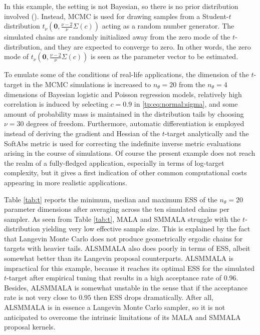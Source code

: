 \documentclass[twoside,11pt]{article}
\begin{document}
In this example, the setting is not Bayesian, so there is no prior distribution involved (\cite{pap_mir_gir__mon}). Instead, 
MCMC is used for drawing samples from a Student-$t$ distribution $t_{\nu}(\mathbf{0},\frac{\nu-2}{\nu}\Sigma(c))$ acting as 
a random number generator. The simulated chains are randomly initialized away from the zero mode of the $t$-distribution, 
and they are expected to converge to zero. In other words, the zero mode of $t_{\nu}(\mathbf{0},\frac{\nu-2}{\nu}\Sigma(c))$ 
is seen as the parameter vector to be estimated.

To emulate some of the conditions of real-life applications, the dimension of the $t$-target in the MCMC simulations is 
increased to $n_{\theta}=20$ from the $n_{\theta}=4$ dimensions of Bayesian logistic and Poisson regression models, 
relatively high correlation is induced by selecting $c=0.9$ in \eqref{tp:eq:normal:sigma}, and some amount of probability 
mass is maintained in the distribution tails by choosing $\nu=30$ degrees of freedom. Furthermore, automatic differentiation 
is employed instead of deriving the gradient and Hessian of the $t$-target analytically and the SoftAbs metric is used for 
correcting the indefinite inverse metric evaluations arising in the course of simulations. Of course the present example does
not reach the realm of a fully-fledged application, especially in terms of log-target complexity, but it gives a first
indication of other common computational costs appearing in more realistic applications.

Table \ref{tab:t} reports the minimum, median and maximum ESS of the $n_{\theta}=20$ parameter dimensions after averaging 
across the ten simulated chains per sampler. As seen from Table \ref{tab:t}, MALA and SMMALA struggle with the 
$t$-distribution yielding very low effective sample size. This is explained by the fact that Langevin Monte Carlo does not 
produce geometrically ergodic chains for targets with heavier tails. ALSMMALA also does poorly in terms of ESS, albeit 
somewhat better than its Langevin proposal counterparts. ALSMMALA is impractical for this example, because it reaches its 
optimal ESS for the simulated $t$-target after empirical tuning that results in a high acceptance rate of $0.96$. Besides, 
ALSMMALA is somewhat unstable in the sense that if the acceptance rate is not very close to $0.95$ then ESS drops 
dramatically. After all, ALSMMALA is in essence a Langevin Monte Carlo sampler, so it is not anticipated to overcome the 
intrinsic limitations of its MALA and SMMALA proposal kernels.
\end{document}
